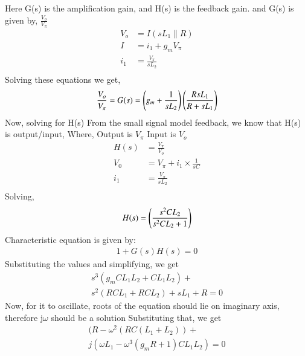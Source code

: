 \begin{enumerate}[label=\arabic*.,ref=\theenumi]
Here G(s) is the amplification gain, and H(s) is the feedback gain.\newline
and G(s) is given by, $\frac{V_o}{V_\pi}$
\begin{align}
    V_o &= I(sL_1\parallel R)\\
    I &= i_1 + g_mV_\pi\\
    i_1 &= \frac{V_\pi}{sL_2}\\
\end{align}
Solving these equations we get,\newline
\begin{align}
    \frac{V_o}{V_\pi} = G(s) = \left(g_m + \frac{1}{sL_2}\right)\left(\frac{RsL_1}{R + sL_1}\right)
\end{align}
Now, solving for H(s)\newline
From the small signal model feedback, we know that H(s) is output/input, \newline
Where,\newline
Output is $V_\pi$\newline
Input is $V_o$\newline
\begin{align}
H(s) &= \frac{V_\pi}{V_o}\\
V_0 &= V_\pi + i_1\times \frac{1}{sC}\\
i_1 &= \frac{V_\pi}{sL_2}\\
\end{align}
Solving,\newline
\begin{align}
    H(s) = \left(\frac{s^2CL_2}{s^2CL_2 +1}\right)
\end{align}
Characteristic equation is given by:\newline
\begin{align}
    1+G(s)H(s) = 0
\end{align}
Substituting the values and simplifying, we get\newline
\begin{multline}
    s^3(g_mCL_1L_2 + CL_1L_2) +\\ s^2(RCL_1 + RCL_2) + sL_1 + R =0
\end{multline}
Now, for it to oscillate, roots of the equation should lie on imaginary axis, therefore j$\omega$ should be a solution\newline
Substituting that, we get
\begin{multline}
    (R - \omega^2(RC(L_1 +L_2)) +\\ j(\omega L_1 - \omega^3(g_mR +1)CL_1L_2) = 0
\end{multline}

\end{enumerate}
